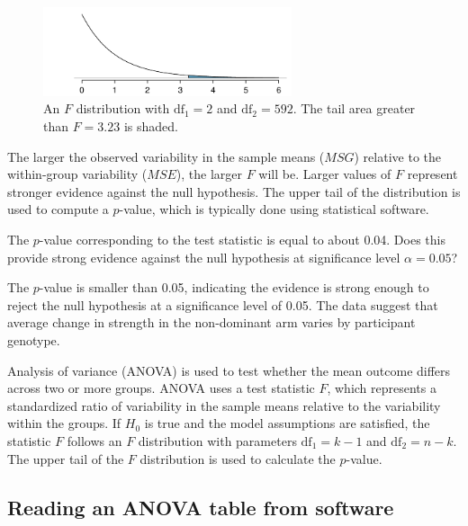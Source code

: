 \begin{figure}[ht]
	\centering
\includegraphics[width=0.65\textwidth]{ch_inference_for_means_oi_biostat/figures/fDist2And592/fDist2And592Shaded}
	\caption{An $F$ distribution with $\textrm{df}_1=2$ and $\textrm{df}_2=592$. The tail area greater than $F = 3.23$ is shaded.}
	\label{fDist2And592Shaded}
\end{figure}

The larger the observed variability in the sample means ($MSG$) relative to the within-group variability ($MSE$), the larger $F$ will be. Larger values of $F$ represent stronger evidence against the null hypothesis. The upper tail of the distribution is used to compute a $p$-value, which is typically done using statistical software.

\begin{example}{The $p$-value corresponding to the test statistic is equal to about 0.04. Does this provide strong evidence against the null hypothesis at significance level $\alpha = 0.05$?
}

The $p$-value is smaller than 0.05, indicating the evidence is strong enough to reject the null hypothesis at a significance level of 0.05. The data suggest that average change in strength in the non-dominant arm varies by participant genotype.	
	
\end{example}

\begin{termBox}{
		Analysis of variance (ANOVA) is used to test whether the mean outcome differs across two or more groups. ANOVA uses a test statistic $F$, which represents a standardized ratio of variability in the sample means relative to the variability within the groups. If $H_0$ is true and the model assumptions are satisfied, the statistic $F$ follows an $F$ distribution with parameters $\textrm{df}_{1}=k-1$ and $\textrm{df}_{2}=n-k$. The upper tail of the $F$ distribution is used to calculate the $p$-value.}
\end{termBox}

\subsection{Reading an ANOVA table from software}

